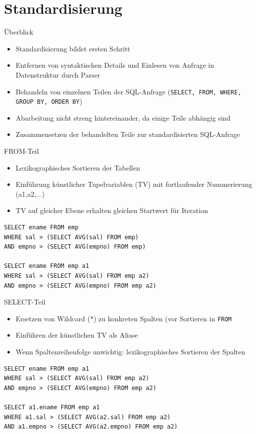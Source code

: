 \documentclass{beamer}
\begin{document}
\section{Standardisierung}

\begin{frame}[fragile]{Überblick}
\begin{itemize}
\item Standardisierung bildet ersten Schritt 
\item Entfernen von syntaktischen Details und Einlesen von Anfrage in Datenstruktur durch Parser
\item Behandeln von einzelnen Teilen der SQL-Anfrage (\verb|SELECT, FROM, WHERE, GROUP BY, ORDER BY|)
\item Abarbeitung nicht streng hintereinander, da einige Teile abhängig sind
\item Zusammensetzen der behandelten Teile zur standardisierten SQL-Anfrage
\end{itemize}
\end{frame}





\begin{frame}[fragile]{FROM-Teil}
\begin{itemize}
\item Lexikographisches Sortieren der Tabellen
\item Einführung künstlicher Tupelvariablen (TV) mit fortlaufender Nummerierung (a1,a2,...)
\item TV auf gleicher Ebene erhalten gleichen Startwert für Iteration
\end{itemize}

\begin{verbatim}
SELECT ename FROM emp
WHERE sal > (SELECT AVG(sal) FROM emp)
AND empno > (SELECT AVG(empno) FROM emp)

SELECT ename FROM emp a1
WHERE sal > (SELECT AVG(sal) FROM emp a2)
AND empno > (SELECT AVG(empno) FROM emp a2)
\end{verbatim}
\end{frame}

\begin{frame}[fragile]{SELECT-Teil}
\begin{itemize}
\item Ersetzen von Wildcard (*) zu konkreten Spalten (vor Sortieren in \verb|FROM|
\item Einführen der künstlichen TV als Aliase
\item Wenn Spaltenreihenfolge unwichtig: lexikographisches Sortieren der Spalten
\end{itemize}

\begin{verbatim}
SELECT ename FROM emp a1
WHERE sal > (SELECT AVG(sal) FROM emp a2)
AND empno > (SELECT AVG(empno) FROM emp a2)

SELECT a1.ename FROM emp a1
WHERE a1.sal > (SELECT AVG(a2.sal) FROM emp a2)
AND a1.empno > (SELECT AVG(a2.empno) FROM emp a2)
\end{verbatim}
\end{frame}
\end{document}
